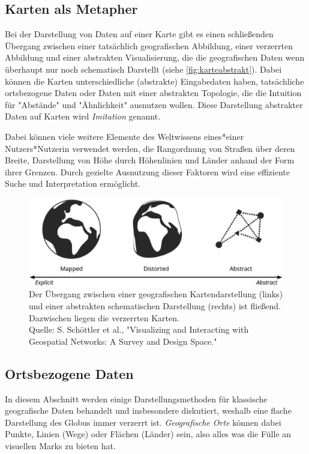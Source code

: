 		\subsection{Karten als Metapher}
			Bei der Darstellung von Daten auf einer Karte gibt es einen schließenden Übergang zwischen einer tatsächlich geografischen Abbildung, einer verzerrten Abbildung und einer abstrakten Visualisierung, die die geografischen Daten wenn überhaupt nur noch schematisch Darstellt (siehe \autoref{fig:karteabstrakt}). Dabei können die Karten unterschiedliche (abstrakte) Eingabedaten haben, \zB tatsächliche ortsbezogene Daten oder Daten mit einer abstrakten Topologie, die die Intuition für "Abstände" und "Ähnlichkeit" ausnutzen wollen. Diese Darstellung abstrakter Daten auf Karten wird \emph{Imitation} genannt.

			Dabei können viele weitere Elemente des Weltwissens eines*einer Nutzers*Nutzerin verwendet werden, \zB die Rangordnung von Straßen über deren Breite, Darstellung von Höhe durch Höhenlinien und Länder anhand der Form ihrer Grenzen. Durch gezielte Ausnutzung dieser Faktoren wird eine effiziente Suche und Interpretation ermöglicht.

			\begin{figure}
				\centering
				\includegraphics[width=0.75\linewidth]{mapabstraction}
				\caption[Illustration des Übergangs zwischen geografischen und schematischen Karten]{Der Übergang zwischen einer geografischen Kartendarstellung (links) und einer abstrakten schematischen Darstellung (rechts) ist fließend. Dazwischen liegen die verzerrten Karten.\\Quelle: S. Schöttler et al., "Visualizing and Interacting with Geospatial Networks: A Survey and Design Space."}
				\label{fig:karteabstrakt}
			\end{figure}

		\subsection{Ortsbezogene Daten}
			In diesem Abschnitt werden einige Darstellungsmethoden für klassische geografische Daten behandelt und insbesondere diskutiert, weshalb eine flache Darstellung des Globus immer verzerrt ist. \emph{Geografische Orte} können dabei Punkte, Linien (\zB Wege) oder Flächen (\zB Länder) sein, also alles was die Fülle an visuellen Marks zu bieten hat.

